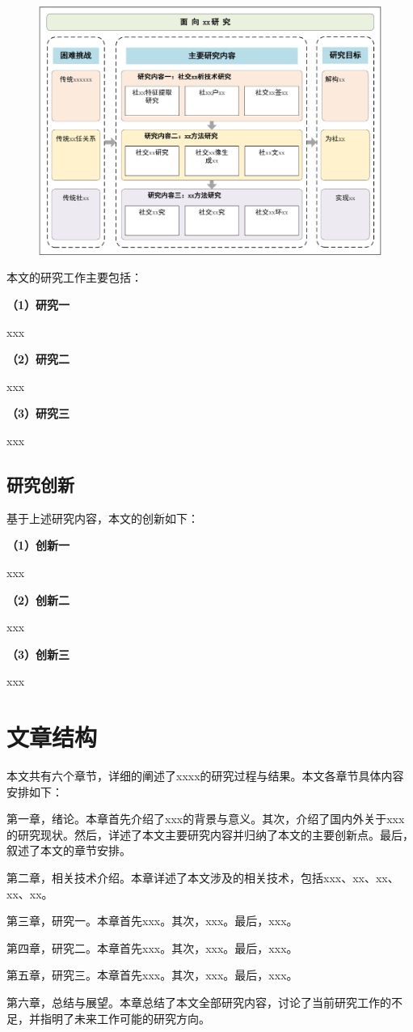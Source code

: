 \begin{figure}[h!] %
	\centering
	\includegraphics[scale=0.65]{Figures/ch1-research framework.pdf}
	\label{fig:research framework}
\end{figure}

本文的研究工作主要包括：

\textbf{（1）研究一}

xxx


\textbf{（2）研究二}

xxx


\textbf{（3）研究三}

xxx

\subsection{研究创新}

基于上述研究内容，本文的创新如下：

\textbf{（1）创新一}

xxx

\textbf{（2）创新二}

xxx

\textbf{（3）创新三}

xxx

\section{文章结构}

本文共有六个章节，详细的阐述了xxxx的研究过程与结果。本文各章节具体内容安排如下：

第一章，绪论。本章首先介绍了xxx的背景与意义。其次，介绍了国内外关于xxx的研究现状。然后，详述了本文主要研究内容并归纳了本文的主要创新点。最后，叙述了本文的章节安排。

第二章，相关技术介绍。本章详述了本文涉及的相关技术，包括xxx、xx、xx、xx、xx。

第三章，研究一。本章首先xxx。其次，xxx。最后，xxx。

第四章，研究二。本章首先xxx。其次，xxx。最后，xxx。

第五章，研究三。本章首先xxx。其次，xxx。最后，xxx。

第六章，总结与展望。本章总结了本文全部研究内容，讨论了当前研究工作的不足，并指明了未来工作可能的研究方向。


